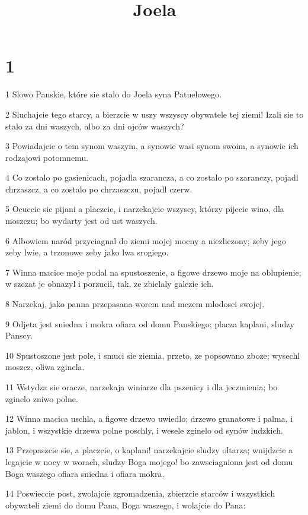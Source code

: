 

\title{Joela}


\chapter{1}

\par 1 Slowo Panskie, które sie stalo do Joela syna Patuelowego.
\par 2 Sluchajcie tego starcy, a bierzcie w uszy wszyscy obywatele tej ziemi! Izali sie to stalo za dni waszych, albo za dni ojców waszych?
\par 3 Powiadajcie o tem synom waszym, a synowie wasi synom swoim, a synowie ich rodzajowi potomnemu.
\par 4 Co zostalo po gasienicach, pojadla szarancza, a co zostalo po szaranczy, pojadl chrzaszcz, a co zostalo po chrzaszczu, pojadl czerw.
\par 5 Ocuccie sie pijani a placzcie, i narzekajcie wszyscy, którzy pijecie wino, dla moszczu; bo wydarty jest od ust waszych.
\par 6 Albowiem naród przyciagnal do ziemi mojej mocny a niezliczony; zeby jego zeby lwie, a trzonowe zeby jako lwa srogiego.
\par 7 Winna macice moje podal na spustoszenie, a figowe drzewo moje na oblupienie; w szczat je obnazyl i porzucil, tak, ze zbielaly galezie ich.
\par 8 Narzekaj, jako panna przepasana worem nad mezem mlodosci swojej.
\par 9 Odjeta jest sniedna i mokra ofiara od domu Panskiego; placza kaplani, sludzy Panscy.
\par 10 Spustoszone jest pole, i smuci sie ziemia, przeto, ze popsowano zboze; wysechl moszcz, oliwa zginela.
\par 11 Wstydza sie oracze, narzekaja winiarze dla pszenicy i dla jeczmienia; bo zginelo zniwo polne.
\par 12 Winna macica uschla, a figowe drzewo uwiedlo; drzewo granatowe i palma, i jablon, i wszystkie drzewa polne poschly, i wesele zginelo od synów ludzkich.
\par 13 Przepaszcie sie, a placzcie, o kaplani! narzekajcie sludzy oltarza; wnijdzcie a legajcie w nocy w worach, sludzy Boga mojego! bo zawsciagniona jest od domu Boga waszego ofiara sniedna i ofiara mokra.
\par 14 Poswieccie post, zwolajcie zgromadzenia, zbierzcie starców i wszystkich obywateli ziemi do domu Pana, Boga waszego, i wolajcie do Pana:
